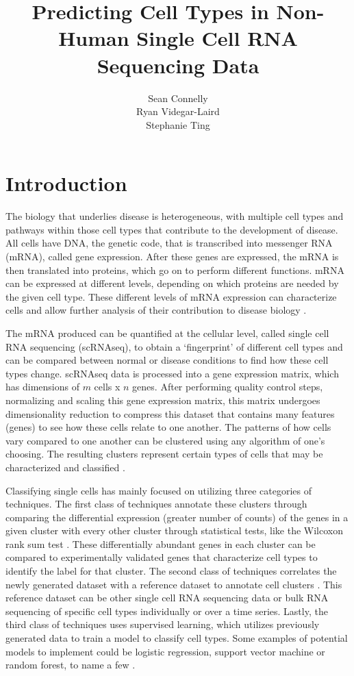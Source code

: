 \documentclass{article}
\title{Predicting Cell Types in Non-Human Single Cell RNA Sequencing Data}
\author{
  Sean Connelly \\
  \And
  Ryan Videgar-Laird \\
  \AND
  Stephanie Ting \\
}
\begin{document}
\maketitle

\section{Introduction}

The biology that underlies disease is heterogeneous, with multiple cell types and pathways within those cell types that contribute to the development of disease. All cells have DNA, the genetic code, that is transcribed into messenger RNA (mRNA), called gene expression. After these genes are expressed, the mRNA is then translated into proteins, which go on to perform different functions. mRNA can be expressed at different levels, depending on which proteins are needed by the given cell type. These different levels of mRNA expression can characterize cells and allow further analysis of their contribution to disease biology \cite{segundo-valIntroductionGeneExpression2016}.

The mRNA produced can be quantified at the cellular level, called single cell RNA sequencing (scRNAseq), to obtain a ‘fingerprint’ of different cell types and can be compared between normal or disease conditions to find how these cell types change. scRNAseq data is processed into a gene expression matrix, which has dimensions of $m$ cells x $n$ genes. After performing quality control steps, normalizing and scaling this gene expression matrix, this matrix undergoes dimensionality reduction to compress this dataset that contains many features (genes) to see how these cells relate to one another. The patterns of how cells vary compared to one another can be clustered using any algorithm of one’s choosing. The resulting clusters represent certain types of cells that may be characterized and classified \cite{aljanahiIntroductionAnalysisSingleCell2018}.

Classifying single cells has mainly focused on utilizing three categories of techniques. The first class of techniques annotate these clusters through comparing the differential expression (greater number of counts) of the genes in a given cluster with every other cluster through statistical tests, like the Wilcoxon rank sum test \cite{wilcoxonIndividualComparisonsGrouped1946}. These differentially abundant genes in each cluster can be compared to experimentally validated genes that characterize cell types to identify the label for that cluster. The second class of techniques correlates the newly generated dataset with a reference dataset to annotate cell clusters \cite{stuartComprehensiveIntegrationSingleCell2019}. This reference dataset can be other single cell RNA sequencing data or bulk RNA sequencing of specific cell types individually or over a time series. Lastly, the third class of techniques uses supervised learning, which utilizes previously generated data to train a model to classify cell types. Some examples of potential models to implement could be logistic regression, support vector machine or random forest, to name a few \cite{heumosBestPracticesSinglecell2023}.
\end{document}
